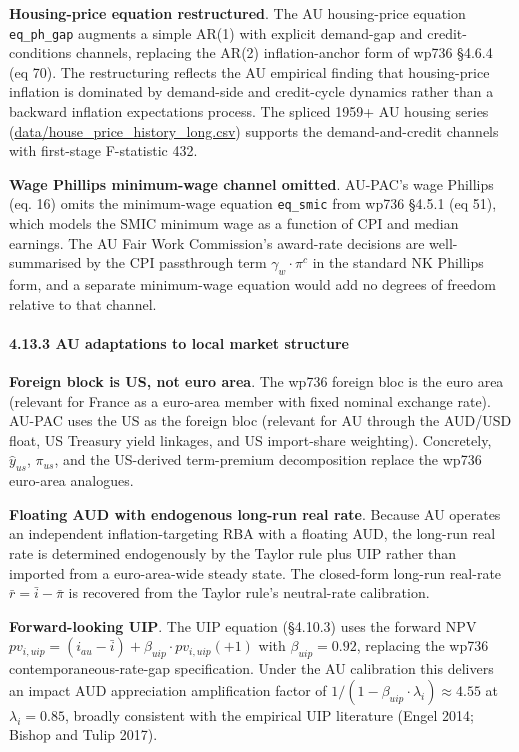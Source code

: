 \documentclass[
]{article}
\begin{document}
\textbf{Housing-price equation restructured}. The AU housing-price
equation \texttt{eq\_ph\_gap} augments a simple AR(1) with explicit
demand-gap and credit-conditions channels, replacing the AR(2)
inflation-anchor form of wp736 §4.6.4 (eq 70). The restructuring
reflects the AU empirical finding that housing-price inflation is
dominated by demand-side and credit-cycle dynamics rather than a
backward inflation expectations process. The spliced 1959+ AU housing
series
(\href{../data/house_price_history_long.csv}{data/house\_price\_history\_long.csv})
supports the demand-and-credit channels with first-stage F-statistic
432.

\textbf{Wage Phillips minimum-wage channel omitted}. AU-PAC's wage
Phillips (eq. 16) omits the minimum-wage equation \texttt{eq\_smic} from
wp736 §4.5.1 (eq 51), which models the SMIC minimum wage as a function
of CPI and median earnings. The AU Fair Work Commission's award-rate
decisions are well-summarised by the CPI passthrough term
\(\gamma_w \cdot \pi^c\) in the standard NK Phillips form, and a
separate minimum-wage equation would add no degrees of freedom relative
to that channel.

\paragraph{4.13.3 AU adaptations to local market
structure}\label{au-adaptations-to-local-market-structure}

\textbf{Foreign block is US, not euro area}. The wp736 foreign bloc is
the euro area (relevant for France as a euro-area member with fixed
nominal exchange rate). AU-PAC uses the US as the foreign bloc (relevant
for AU through the AUD/USD float, US Treasury yield linkages, and US
import-share weighting). Concretely, \(\hat{y}_{us}\), \(\pi_{us}\), and
the US-derived term-premium decomposition replace the wp736 euro-area
analogues.

\textbf{Floating AUD with endogenous long-run real rate}. Because AU
operates an independent inflation-targeting RBA with a floating AUD, the
long-run real rate is determined endogenously by the Taylor rule plus
UIP rather than imported from a euro-area-wide steady state. The
closed-form long-run real-rate \(\bar{r} = \bar{i} - \bar{\pi}\) is
recovered from the Taylor rule's neutral-rate calibration.

\textbf{Forward-looking UIP}. The UIP equation (§4.10.3) uses the
forward NPV
\(pv_{i,uip} = (i_{au} - \bar{i}) + \beta_{uip} \cdot pv_{i,uip}(+1)\)
with \(\beta_{uip} = 0.92\), replacing the wp736
contemporaneous-rate-gap specification. Under the AU calibration this
delivers an impact AUD appreciation amplification factor of
\(1 / (1 - \beta_{uip} \cdot \lambda_i) \approx 4.55\) at
\(\lambda_i = 0.85\), broadly consistent with the empirical UIP
literature (Engel 2014; Bishop and Tulip 2017).
\end{document}
